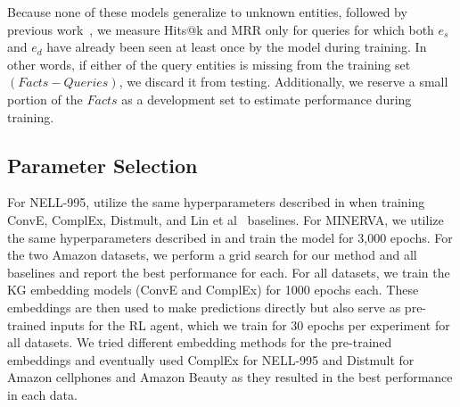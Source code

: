  Because none of these models generalize to unknown entities, followed by previous work~\cite{das2017go,lin2018multi}, we measure Hits@k and MRR only for queries for which both $e_s$ and $e_d$ have already been seen at least once by the model during training. In other words, if either of the query entities is missing from the training set $(Facts - Queries)$, we discard it from testing. Additionally, we reserve a small portion of the $Facts$ as a development set to estimate performance during training.

\subsection{Parameter Selection} \label{sec:params}
For NELL-995, utilize the same hyperparameters described in \cite{lin2018multi} when training ConvE, ComplEx, Distmult, and Lin et al~\cite{lin2018multi} baselines. For MINERVA, we utilize the same hyperparameters described in \cite{das2017go} and train the model for 3,000 epochs. For the two Amazon datasets, we perform a grid search for our method and all baselines and report the best performance for each. For all datasets, we train the KG embedding models (ConvE and ComplEx) for 1000 epochs each. These embeddings are then used to make predictions directly but also serve as pre-trained inputs for the RL agent, which we train for 30 epochs per experiment for all datasets. We tried different embedding methods for the pre-trained embeddings and eventually used ComplEx for NELL-995 and Distmult for Amazon cellphones and Amazon Beauty as they resulted in the best performance in each data.





